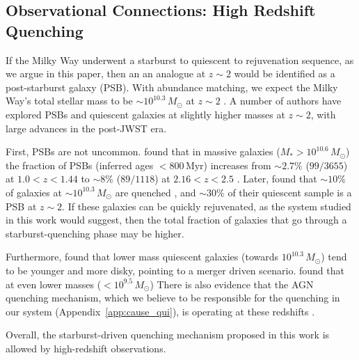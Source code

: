 \documentclass[twocolumn,linenumbers,trackchanges]{aastex631}
\newcommand{\Msun}{\ensuremath{M_{\odot}}}
\newcommand{\Myr}{\ensuremath{\textrm{Myr}}}
\begin{document}
\subsection{Observational Connections: High Redshift Quenching}\label{ssec:obshiz}
If the Milky Way underwent a starburst to quiescent to rejuvenation sequence, as we argue in this paper, then an an analogue at $z\sim2$ would be identified as a post-starburst galaxy (PSB). With abundance matching, we expect the Milky Way's total stellar mass to be $\sim10^{10.3}\,\Msun$ at $z\sim2$ \citep{2013ApJ...771L..35V}. A number of authors have explored PSBs and quiescent galaxies at slightly higher masses at $z\sim2$, with large advances in the post-JWST era.

First, PSBs are not uncommon. \citet{2023ApJ...953..119P} found that in massive galaxies ($M_* > 10^{10.6}\,\Msun$) the fraction of PSBs (inferred ages $< 800\,\Myr$) increases from $\sim2.7\%$ ($99/3655$) at $1.0 < z < 1.44$ to $\sim8\%$ ($89/1118$) at $2.16 < z < 2.5$ \citep[see also][]{2012ApJ...745..179W,2019ApJ...874...17B}. Later, \citet{2024arXiv240417945P} found that $\sim10\%$ of galaxies at $\sim10^{10.3}\,\Msun$ are quenched \citep[consistent with][]{2013ApJ...777...18M}, and $\sim30\%$ of their quiescent sample is a PSB at $z\sim2$. If these galaxies can be quickly rejuvenated, as the system studied in this work would suggest, then the total fraction of galaxies that go through a starburst-quenching phase may be higher.

Furthermore, \citet{2023arXiv231215012C} found that lower mass quiescent galaxies (towards $10^{10.3}\,\Msun$) tend to be younger and more disky, pointing to a merger driven scenario. \citet{2023arXiv231212207A} found that at even lower masses ($<10^{9.5}\,\Msun$) There is also evidence that the AGN quenching mechanism, which we believe to be responsible for the quenching in our system (Appendix~\ref{app:cause_qui}), is operating at these redshifts \citep[e.g.][and references therein]{2023arXiv230806317D,2024arXiv240417945P,2024arXiv240518685M,2024Natur.630...54B}.

Overall, the starburst-driven quenching mechanism proposed in this work is allowed by high-redshift observations.
\end{document}
